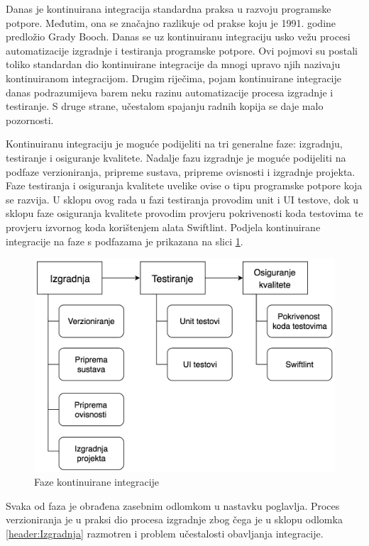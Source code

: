 \documentclass[times, utf8, diplomski, numeric]{fer}
\begin{document}
Danas je kontinuirana integracija standardna praksa u razvoju programske potpore. Međutim, ona se značajno razlikuje od prakse koju je 1991. godine predložio Grady Booch. Danas se uz kontinuiranu integraciju usko vežu procesi automatizacije izgradnje i testiranja programske potpore. Ovi pojmovi su postali toliko standardan dio kontinuirane integracije da mnogi upravo njih nazivaju kontinuiranom integracijom. Drugim riječima, pojam kontinuirane integracije danas podrazumijeva barem neku razinu automatizacije procesa izgradnje i testiranje. S druge strane, učestalom spajanju radnih kopija se daje malo pozornosti.

Kontinuiranu integraciju je moguće podijeliti na tri generalne faze: izgradnju, testiranje i osiguranje kvalitete. Nadalje fazu izgradnje je moguće podijeliti na podfaze verzioniranja, pripreme sustava, pripreme ovisnosti i izgradnje projekta. Faze testiranja i osiguranja kvalitete uvelike ovise o tipu programske potpore koja se razvija. U sklopu ovog rada u fazi testiranja provodim unit i UI testove, dok u sklopu faze osiguranja kvalitete provodim provjeru pokrivenosti koda testovima te provjeru izvornog koda korištenjem alata Swiftlint. Podjela kontinuirane integracije na faze s podfazama je prikazana na slici \ref{fig:CIFazes}.

\begin{figure}
\centering
\includegraphics[scale=0.6]{CIFazes}
\caption{Faze kontinuirane integracije}
\label{fig:CIFazes}
\end{figure}

Svaka od faza je obrađena zasebnim odlomkom u nastavku poglavlja. Proces verzioniranja je u praksi dio procesa izgradnje zbog čega je u sklopu odlomka \ref{header:Izgradnja} razmotren i problem učestalosti obavljanja integracije.
\end{document}
